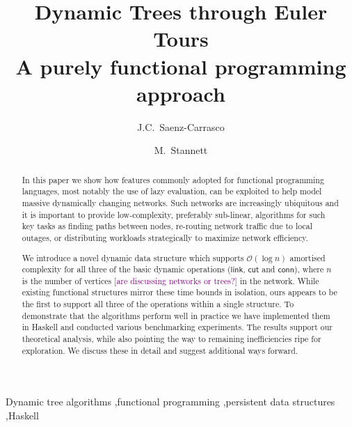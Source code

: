 \documentclass{elsarticle}
\newcommand{\madd}[1]{\textcolor{Purple}{#1}}
\newcommand{\MATHSF}[1]{\ensuremath{\mathsf{#1}}\xspace}
\newcommand{\link}{\MATHSF{link}}
\newcommand{\cut}{\MATHSF{cut}}
\newcommand{\conn}{\MATHSF{conn}}
\renewcommand{\O}{\ensuremath{\mathcal{O}}}
\begin{document}
\title{Dynamic Trees through Euler Tours\\%
\large{A purely functional programming approach}}

\author{J.C.~Saenz-Carrasco}

\author{M.~Stannett}

\address{Department of Computer Science,\\
Regent Court, 211 Portobello,\\
Sheffield S1 4DP, United Kingdom}


\begin{abstract}
In this paper we show how features commonly adopted for functional programming languages, most notably the use of lazy evaluation, can be exploited to help model massive dynamically changing networks. Such networks are increasingly ubiquitous and it is important to provide low-complexity, preferably sub-linear, algorithms for such key tasks as finding paths between nodes, re-routing network traffic due to local outages, or distributing workloads strategically to maximize network efficiency.

We introduce a novel dynamic data structure which supports $\O(\log n)$ amortised complexity for all three of the basic dynamic operations (\link, \cut and \conn), where $n$ is the number of vertices \madd{[are discussing networks or trees?]} in the network. While existing functional structures mirror these time bounds in isolation, ours appears to be the first to support all three of the operations within a single structure. To demonstrate that the algorithms perform well in practice we have implemented them in Haskell and conducted various benchmarking experiments. The results support our theoretical analysis, while also pointing the way to remaining inefficiencies ripe for exploration. We discuss these in detail and suggest additional ways forward.
\end{abstract}

\begin{keyword}
Dynamic tree algorithms \sep functional programming \sep persistent data structures \sep Haskell
\end{keyword}
\end{document}
